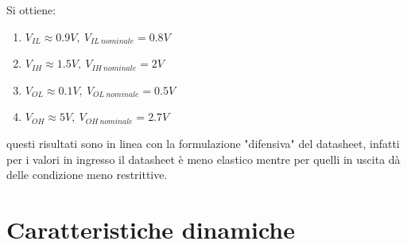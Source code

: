 \documentclass[10pt,a4paper]{article}
\begin{document}
Si ottiene:
\begin{enumerate}
	\item $V_{IL}\approx0.9 V,~V_{IL~nominale}=0.8V$
	\item $V_{IH}		\approx 1.5V,~V_{IH~nominale}=2V$
	\item $V_{OL}\approx0.1V,~V_{OL~nominale}=0.5V$
	\item $V_{OH}\approx5V,~V_{OH~nominale}=2.7V$
\end{enumerate}
questi  risultati sono in linea con la formulazione "difensiva" del datasheet, infatti per i valori in ingresso il datasheet è meno elastico mentre per quelli in uscita dà delle condizione meno restrittive.

	\section{Caratteristiche dinamiche}
\end{document}
